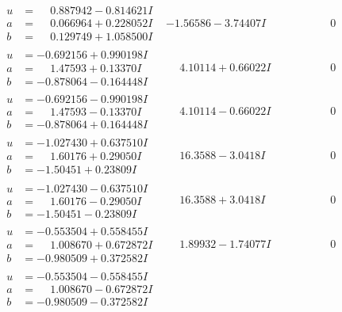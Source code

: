 \documentclass[1p]{elsarticle_modified}
\theoremstyle{definition}
\begin{document}
$$\begin{array}{c|c|c}
\begin{aligned}
u &= \phantom{-}0.887942 - 0.814621 I \\
a &= \phantom{-}0.066964 + 0.228052 I \\
b &= \phantom{-}0.129749 + 1.058500 I\end{aligned}
 & -1.56586 - 3.74407 I & \phantom{-0.000000 } 0 \\ \hline\begin{aligned}
u &= -0.692156 + 0.990198 I \\
a &= \phantom{-}1.47593 + 0.13370 I \\
b &= -0.878064 - 0.164448 I\end{aligned}
 & \phantom{-}4.10114 + 0.66022 I & \phantom{-0.000000 } 0 \\ \hline\begin{aligned}
u &= -0.692156 - 0.990198 I \\
a &= \phantom{-}1.47593 - 0.13370 I \\
b &= -0.878064 + 0.164448 I\end{aligned}
 & \phantom{-}4.10114 - 0.66022 I & \phantom{-0.000000 } 0 \\ \hline\begin{aligned}
u &= -1.027430 + 0.637510 I \\
a &= \phantom{-}1.60176 + 0.29050 I \\
b &= -1.50451 + 0.23809 I\end{aligned}
 & \phantom{-}16.3588 - 3.0418 I & \phantom{-0.000000 } 0 \\ \hline\begin{aligned}
u &= -1.027430 - 0.637510 I \\
a &= \phantom{-}1.60176 - 0.29050 I \\
b &= -1.50451 - 0.23809 I\end{aligned}
 & \phantom{-}16.3588 + 3.0418 I & \phantom{-0.000000 } 0 \\ \hline\begin{aligned}
u &= -0.553504 + 0.558455 I \\
a &= \phantom{-}1.008670 + 0.672872 I \\
b &= -0.980509 + 0.372582 I\end{aligned}
 & \phantom{-}1.89932 - 1.74077 I & \phantom{-0.000000 } 0 \\ \hline\begin{aligned}
u &= -0.553504 - 0.558455 I \\
a &= \phantom{-}1.008670 - 0.672872 I \\
b &= -0.980509 - 0.372582 I\end{aligned}

\end{array}$$
\end{document}
